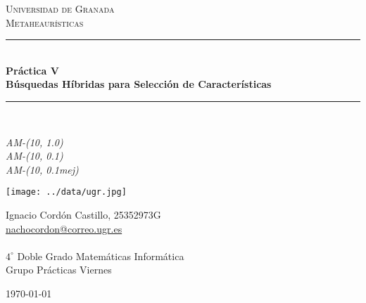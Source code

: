 \documentclass[a4paper,11pt]{article}
\begin{document}
\begin{titlepage}

\newcommand{\HRule}{\rule{\linewidth}{0.5mm}} %

\center %
 
\textsc{\LARGE Universidad de Granada}\\[1.5cm]
\textsc{\Large Metaheaurísticas}\\[0.5cm] 

\bigskip
\HRule \\[0.4cm]
{ \huge \bfseries Práctica V}\\[0.4cm] %
{ \huge \bfseries Búsquedas Híbridas para Selección de Características}\\
\HRule \\[1.5cm]
 

\begin{minipage}{\textwidth}
\begin{center} \large
\emph{AM-(10, 1.0)}\\
\emph{AM-(10, 0.1)}\\
\emph{AM-(10, 0.1mej)}\\
\end{center}
\end{minipage}


\begin{center}
\texttt{[image: ../data/ugr.jpg]}
\end{center}

\begin{minipage}{\textwidth}
\begin{center} \large
Ignacio Cordón Castillo, 25352973G\\
\url{nachocordon@correo.ugr.es}\\
\ \\
$4^{\circ}$ Doble Grado Matemáticas Informática\\
Grupo Prácticas Viernes
\end{center}
\end{minipage}


\vspace{\fill}%
\large\today
\end{titlepage}  
\end{document}
